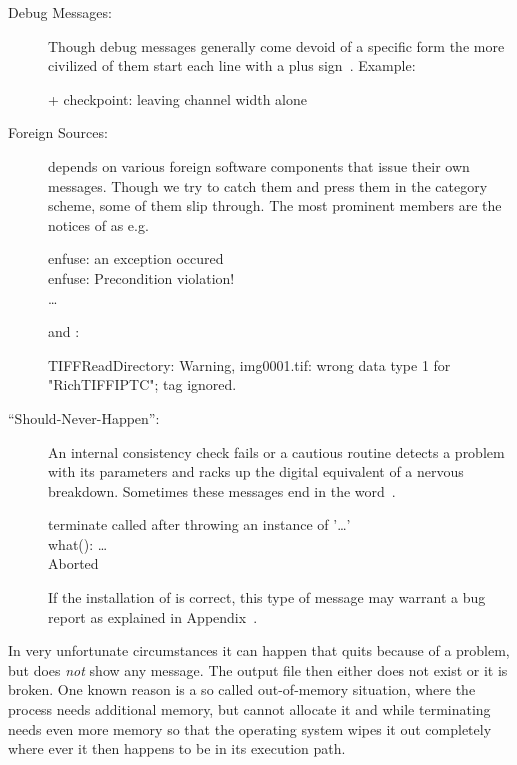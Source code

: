 \begin{description}
\item[Debug Messages:] Though debug messages generally come devoid of
  a specific form the more civilized of them start each line with a
  plus sign~\sample{+}.  Example:

  \begin{literal}
    + checkpoint: leaving channel width alone
  \end{literal}

\item[Foreign Sources:] \appcmd{} depends on various foreign software
  components that issue their own messages.  Though we try to catch
  them and press them in the category scheme, some of them slip
  through.  The most prominent members are the notices of
   as e.g.

  \begin{literal}
    enfuse: an exception occured \\
    enfuse: Precondition violation! \\
    \dots
  \end{literal}

  and :

  \begin{literal}
    TIFFReadDirectory: Warning, img0001.tif: wrong data type 1 for "RichTIFFIPTC"; tag ignored.
  \end{literal}

\item[``Should-Never-Happen'':] An internal consistency check fails or
  a cautious routine detects a problem with its parameters and racks
  up the digital equivalent of a nervous breakdown.  Sometimes these
  messages end in the word~.
  \begin{literal}
    terminate called after throwing an instance of '\dots' \\
    what(): \dots \\
    Aborted
  \end{literal}

  If the installation of \appcmd{} is correct, this type of message
  may warrant a bug report as explained in
  Appendix~.
\end{description}

In very unfortunate circumstances it can happen that \App{} quits
because of a problem, but does \emph{not} show any message.  The
output file then either does not exist or it is broken.  One known
reason is a so called out-of-memory situation, where the process needs
additional memory, but cannot allocate it and while terminating needs
even more memory so that the operating system wipes it out completely
where ever it then happens to be in its execution path.


